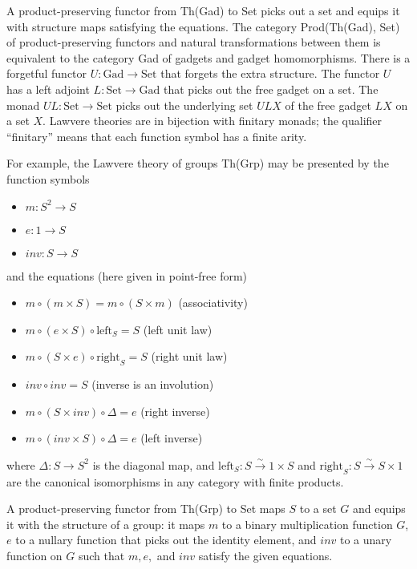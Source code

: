 \documentclass{article}
\newcommand{\maps}{\colon}
\newcommand{\Set}{\mathrm{Set}}
\newcommand{\Gad}{\mathrm{Gad}}
\begin{document}
A product-preserving functor from Th(Gad) to Set picks out a set and equips it with structure maps satisfying the equations.  The category Prod(Th(Gad), Set) of product-preserving functors and natural transformations between them is equivalent to the category Gad of gadgets and gadget homomorphisms.  There is a forgetful functor ${U\maps \Gad \to \Set}$ that forgets the extra structure.  The functor $U$ has a left adjoint ${L\maps \Set \to \Gad}$ that picks out the free gadget on a set.  The monad $UL\maps \Set \to \Set$ picks out the underlying set $ULX$ of the free gadget $LX$ on a set $X$.  Lawvere theories are in bijection with finitary monads; the qualifier ``finitary'' means that each function symbol has a finite arity.

For example, the Lawvere theory of groups Th(Grp) may be presented by the function symbols
\begin{itemize}
  \item $m\maps S^2 \to S$
  \item $e\maps 1 \to S$
  \item $inv \maps S \to S$
\end{itemize}
and the equations (here given in point-free form)
\begin{itemize}
  \item $m \circ (m \times S) = m \circ (S \times m)$ (associativity)
  \item $m \circ (e \times S) \circ \mathrm{left}_S = S$ (left unit law)
  \item $m \circ (S \times e) \circ \mathrm{right}_S = S$ (right unit law)
  \item $inv \circ inv = S$ (inverse is an involution)
  \item $m \circ (S \times inv) \circ \Delta = e$ (right inverse)
  \item $m \circ (inv \times S) \circ \Delta = e$ (left inverse)
\end{itemize}
where ${\Delta\maps S \to S^2}$ is the diagonal map, and ${\mathrm{left}_S\maps S \stackrel{\sim}{\to} 1 \times S}$ and ${\mathrm{right}_S\maps S \stackrel{\sim}{\to} S \times 1}$ are the canonical isomorphisms in any category with finite products.

A product-preserving functor from Th(Grp) to Set maps $S$ to a set $G$ and equips it with the structure of a group: it maps $m$ to a binary multiplication function $G$, $e$ to a nullary function that picks out the identity element, and $inv$ to a unary function on $G$ such that $m, e,$ and $inv$ satisfy the given equations.
\end{document}
